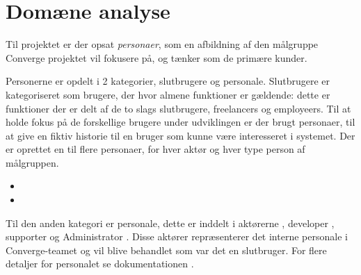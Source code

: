 \section{Domæne analyse}

Til projektet er der opsat \emph{personaer}, som en afbildning af den målgruppe Converge projektet vil fokusere på, og tænker som de primære kunder.

Personerne er opdelt i 2 kategorier, slutbrugere og personale. Slutbrugere er kategoriseret som brugere, der hvor almene funktioner er gældende: dette er funktioner der er delt af de to slags slutbrugere, freelancers og employeers.  Til at holde fokus på de forskellige brugere under udviklingen er der brugt personaer, til at give en fiktiv historie til en bruger som kunne være interesseret i systemet. Der er oprettet en til flere personaer, for hver aktør og hver type person af målgruppen.

\begin{itemize}
    \item {}
    \item {}
\end{itemize}

Til den anden kategori er personale, dette er inddelt i aktørerne , developer , supporter  og Administrator . Disse aktører repræsenterer det interne personale i Converge-teamet og vil blive behandlet som var det en slutbruger. For flere detaljer for personalet se dokumentationen \cite[Funktionelle krav]{documentation-kravspec}. 
